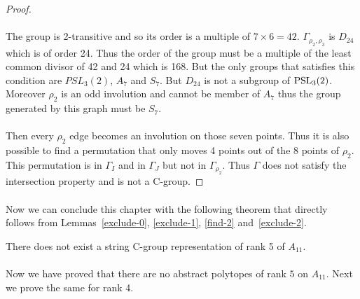 \begin{proof}
  \paragraph{}
  The group is 2-transitive and so its order is a multiple of $7 \times 6 = 42$. $\Gamma_{\rho_2, \rho_3}$ is $D_{24}$ which is of order 24. Thus the order of the group must be a multiple of the least common divisor of 42 and 24 which is 168. But the only groups that satisfies this condition are $PSL_3(2)$, $A_7$ and $S_7$. But $D_{24}$ is not a subgroup of $\operatorname{PSL}_3(2)$. Moreover $\rho_2$ is an odd involution and cannot be member of $A_7$ thus the group generated by this graph must be $S_7$.

  \paragraph{}
  Then every $\rho_2$ edge becomes an involution on those seven points. Thus it is also possible to find a permutation that only moves 4 points out of the 8 points of $\rho_2$. This permutation is in $\Gamma_{I}$ and in $\Gamma_{J}$ but not in $\Gamma_{\rho_2}$. Thus $\Gamma$ does not satisfy the intersection property and is not a C-group.

\end{proof}

\paragraph{}
Now we can conclude this chapter with the following theorem that directly follows from Lemmas~\ref{exclude-0}, \ref{exclude-1}, \ref{find-2} and~\ref{exclude-2}.

\begin{theorem}
  There does not exist a string C-group representation of rank 5 of $A_{11}$.
\end{theorem}

\paragraph{}
Now we have proved that there are no abstract polytopes of rank $5$ on $A_{11}$. Next we prove the same for rank 4.
